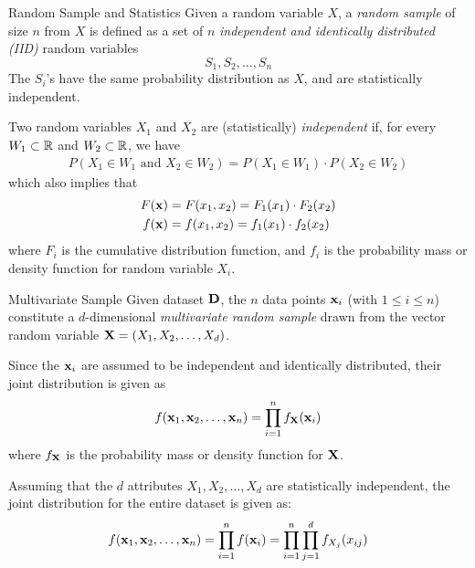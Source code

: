 \begin{frame}{Random Sample and Statistics}
  Given a random variable $X$, a {\em random sample} of size $n$
from $X$ is def\/{i}ned as a set of $n$ {\em independent and
identically distributed (IID)}
random variables 
$$S_1, S_2, \ldots, S_n$$
The $S_i$'s have the same probability distribution as $X$, and are
statistically independent.

Two random variables $X_1$ and $X_2$ are
(statistically) {\em independent}
if, for every
$W_1 \subset {\mathord{\mathbb R}}$ and $W_2 \subset {\mathord{\mathbb R}}$, we have
\begin{align*}
    P(X_1 \in W_1 \text{ and } X_2 \in W_2) = P(X_1 \in W_1) \cdot
    P(X_2 \in W_2)
\end{align*}
which also implies that 
\begin{align*}
        F(\mathbf{x}) & = F(x_1, x_2) = F_{1}(x_1) \cdot F_{2}(x_2)\\
        f(\mathbf{x}) & = f(x_1, x_2) = f_{1}(x_1) \cdot f_{2}(x_2)
\end{align*}
where $F_{i}$ is the cumulative distribution function,
and $f_{i}$ is the probability mass or density function for random
variable $X_i$.
\end{frame}


\begin{frame}{Multivariate Sample}
Given dataset $\mathbf{D}$, the $n$ data
points $\mathbf{x}_i$ (with $1 \le i \le n$)
constitute a $d$-dimensional {\em multivariate random sample} drawn
from the vector random variable $\mathbf{X} = (X_1, X_2, \ldots, X_d)$.

\smallskip
Since the $\mathbf{x}_i$ are assumed to be
independent and
identically distributed, their joint distribution is given as
\begin{align*}
f(\mathbf{x}_1, \mathbf{x}_2, \ldots, \mathbf{x}_n) = \prod_{i=1}^n f_{\mathbf{X}}(\mathbf{x}_i)
\end{align*}
where $f_{\mathbf{X}}$ is the probability mass or density function for $\mathbf{X}$.

\smallskip
Assuming that the $d$
attributes $X_1, X_2, \ldots, X_d$ are statistically independent, the 
joint distribution for the entire dataset is given as:
\begin{align*}
f(\mathbf{x}_1, \mathbf{x}_2, \ldots, \mathbf{x}_n) =
\prod_{i=1}^n f(\mathbf{x}_i) = \prod_{i=1}^n \prod_{j=1}^d
f_{X_{j}}(x_{ij})
\end{align*}

\end{frame}


